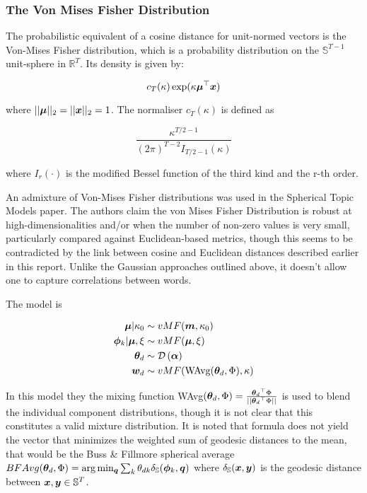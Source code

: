\subsubsection{The Von Mises Fisher Distribution}

The probabilistic equivalent of a cosine distance for unit-normed vectors is the Von-Mises Fisher distribution, which is a probability distribution on the $\mathbb{S}^{T-1}$ unit-sphere in $\mathbb{R}^{T}$. Its density is given by:

\begin{equation}
c_T(\kappa)\exp(\kappa \bm \mu^\top\bm x)
\end{equation}

where $||\bm \mu||_2 = ||\bm x||_2 = 1$. The normaliser $c_T(\kappa)$ is defined as

\begin{equation}
\frac{\kappa ^{T\!/\!2-1}}{(2\pi)^{T-2} I_{T\!/\!2-1}(\kappa)}
\end{equation}

where $I_r(\cdot)$ is the modified Bessel function of the third kind and the r-th order.


An admixture of Von-Mises Fisher distributions was used in the Spherical Topic Models paper\cite{Reisinger2010}. The authors claim the von Mises Fisher Distribution is robust at high-dimensionalities and/or when the number of non-zero values is very small, particularly compared against Euclidean-based metrics, though this seems to be contradicted by the link between cosine and Euclidean distances described earlier in this report. Unlike the Gaussian approaches outlined above, it doesn't allow one to capture correlations between words.

The model is

\begin{align}
\bm \mu | \kappa_0 & \sim  vMF(\bm m, \kappa_0) \\
\bm \phi_k | \bm \mu, \xi & \sim  vMF(\bm \mu, \xi) \\
{ \bm \theta_d } & \sim  \mathcal{D} \left( {\bm \alpha} \right) \\
{ \bm w_d } & \sim  vMF(\text{WAvg}({ \bm \theta_d }, \Phi), \kappa) 
\end{align}

In this model they the mixing function WAvg$({ \bm \theta_d }, \Phi) = \frac{{ \bm \theta_d }^\top\Phi}{||{ \bm \theta_d }^\top\Phi||}$ is used to blend the individual component distributions, though it is not clear that this constitutes a valid mixture distribution.  It is noted that formula does not yield the vector that minimizes the weighted sum of geodesic distances to the mean, that would be the  Buss \& Fillmore spherical average $BFAvg({ \bm \theta_d },\Phi) = \arg \min_{\bm q} \sum_k { \theta_{dk} } \delta_\mathbb{S}(\bm \phi_k, \bm q)$ where $\delta_\mathbb{S}(\bm x, \bm y)$ is the geodesic distance between $\bm x, \bm y \in \mathbb{S}^T$. 

